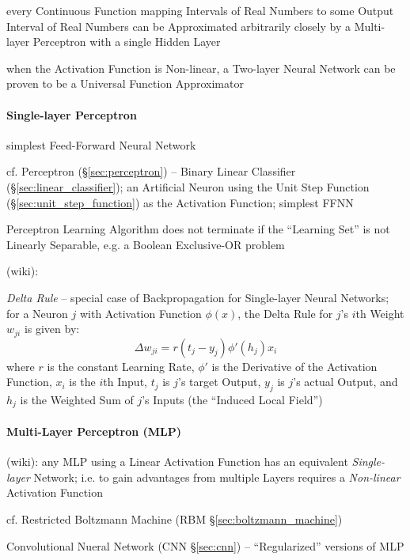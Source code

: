 every Continuous Function mapping Intervals of Real Numbers to some Output
Interval of Real Numbers can be Approximated arbitrarily closely by a
Multi-layer Perceptron with a single Hidden Layer

when the Activation Function is Non-linear, a Two-layer Neural Network can be
proven to be a Universal Function Approximator



\paragraph{Single-layer Perceptron}\label{sec:single_layer_perceptron}\hfill

simplest Feed-Forward Neural Network

cf. Perceptron (\S\ref{sec:perceptron}) -- Binary Linear Classifier
(\S\ref{sec:linear_classifier}); an Artificial Neuron using the Unit Step
Function (\S\ref{sec:unit_step_function}) as the Activation Function; simplest
FFNN

Perceptron Learning Algorithm does not terminate if the ``Learning Set'' is not
Linearly Separable, e.g. a Boolean Exclusive-OR problem

(wiki):

\emph{Delta Rule} -- special case of Backpropagation for Single-layer Neural
Networks; for a Neuron $j$ with Activation Function $\phi(x)$, the Delta Rule
for $j$'s $i$th Weight $w_{ji}$ is given by:
\[
  \Delta w_{ji} = r(t_j - y_j) \phi'(h_j) x_i
\]
where $r$ is the constant Learning Rate, $\phi'$ is the Derivative of the
Activation Function, $x_i$ is the $i$th Input, $t_j$ is $j$'s target Output,
$y_j$ is $j$'s actual Output, and $h_j$ is the Weighted Sum of $j$'s Inputs (the
``Induced Local Field'')



\paragraph{Multi-Layer Perceptron (MLP)}\label{sec:mlp}\hfill

(wiki): any MLP using a Linear Activation Function has an equivalent
\emph{Single-layer} Network; i.e. to gain advantages from multiple Layers
requires a \emph{Non-linear} Activation Function

cf. Restricted Boltzmann Machine (RBM \S\ref{sec:boltzmann_machine})

\fist Convolutional Nueral Network (CNN \S\ref{sec:cnn}) -- ``Regularized''
versions of MLP



